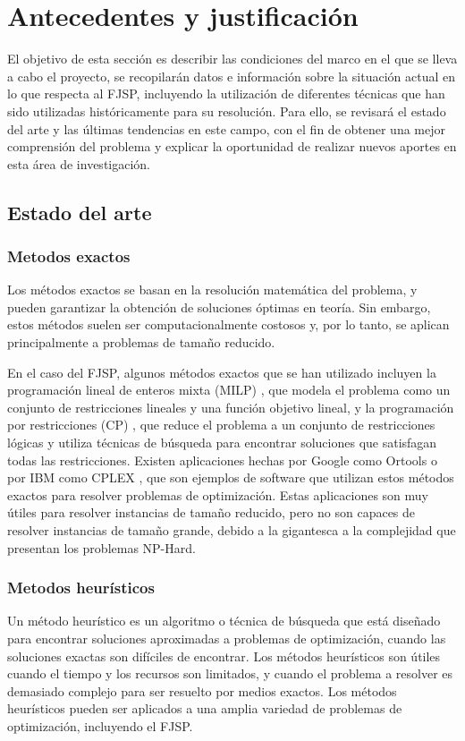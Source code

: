 \section{Antecedentes y justificación}
El objetivo de esta sección es describir las condiciones del marco en el que se
lleva a cabo el proyecto, se recopilarán datos e información sobre la situación
actual en lo que respecta al FJSP, incluyendo la utilización de diferentes
técnicas que han sido utilizadas históricamente para su resolución. Para ello,
se revisará el estado del arte y las últimas tendencias en este campo, con el
fin de obtener una mejor comprensión del problema y explicar la oportunidad de
realizar nuevos aportes en esta área de investigación.

\subsection{Estado del arte}
\subsubsection{Metodos exactos}
Los métodos exactos se basan en la resolución matemática del problema, y pueden
garantizar la obtención de soluciones óptimas en teoría. Sin embargo, estos
métodos suelen ser computacionalmente costosos y, por lo tanto, se aplican
principalmente a problemas de tamaño reducido.\medskip

En el caso del FJSP, algunos métodos exactos que se han utilizado incluyen la
programación lineal de enteros mixta (MILP) \cite{milp}, que modela el problema
como un conjunto de restricciones lineales y una función objetivo lineal, y la
programación por restricciones (CP) \cite{wikiCP}, que reduce el problema a un
conjunto de restricciones lógicas y utiliza técnicas de búsqueda para encontrar
soluciones que satisfagan todas las restricciones. Existen aplicaciones hechas
por Google como Ortools \cite{ortools} o por IBM como CPLEX \cite{cplex}, que son
ejemplos de software que utilizan estos métodos exactos para resolver problemas
de optimización. Estas aplicaciones son muy útiles para resolver instancias de
tamaño reducido, pero no son capaces de resolver instancias de tamaño grande,
debido a la gigantesca a la complejidad que presentan los problemas NP-Hard.

\subsubsection{Metodos heurísticos}
Un método heurístico \cite{Novoseltseva_2021} es un algoritmo o técnica de
búsqueda que está diseñado para encontrar soluciones aproximadas a problemas de
optimización, cuando las soluciones exactas son difíciles de encontrar. Los
métodos heurísticos son útiles cuando el tiempo y los recursos son limitados, y
cuando el problema a resolver es demasiado complejo para ser resuelto por
medios exactos. Los métodos heurísticos pueden ser aplicados a una amplia
variedad de problemas de optimización, incluyendo el FJSP.\medskip

